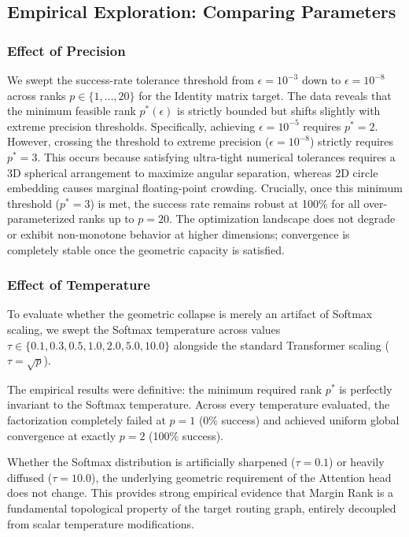 
\subsection{Empirical Exploration: Comparing Parameters}

\subsubsection{Effect of Precision}
We swept the success-rate tolerance threshold from $\epsilon=10^{-3}$ down to $\epsilon=10^{-8}$ across ranks $p \in \{1, \dots, 20\}$ for the Identity matrix target. The data reveals that the minimum feasible rank $p^*(\epsilon)$ is strictly bounded but shifts slightly with extreme precision thresholds. 
Specifically, achieving $\epsilon=10^{-5}$ requires $p^* = 2$. However, crossing the threshold to extreme precision ($\epsilon=10^{-8}$) strictly requires $p^* = 3$. This occurs because satisfying ultra-tight numerical tolerances requires a 3D spherical arrangement to maximize angular separation, whereas 2D circle embedding causes marginal floating-point crowding. 
Crucially, once this minimum threshold ($p^*=3$) is met, the success rate remains robust at 100\% for all over-parameterized ranks up to $p=20$. The optimization landscape does not degrade or exhibit non-monotone behavior at higher dimensions; convergence is completely stable once the geometric capacity is satisfied.

\subsubsection{Effect of Temperature}
To evaluate whether the geometric collapse is merely an artifact of Softmax scaling, we swept the Softmax temperature across values $\tau \in \{0.1, 0.3, 0.5, 1.0, 2.0, 5.0, 10.0\}$ alongside the standard Transformer scaling ($\tau = \sqrt{p}$). 

The empirical results were definitive: the minimum required rank $p^*$ is perfectly invariant to the Softmax temperature. Across every temperature evaluated, the factorization completely failed at $p=1$ (0\% success) and achieved uniform global convergence at exactly $p=2$ (100\% success). 

Whether the Softmax distribution is artificially sharpened ($\tau=0.1$) or heavily diffused ($\tau=10.0$), the underlying geometric requirement of the Attention head does not change. This provides strong empirical evidence that Margin Rank is a fundamental topological property of the target routing graph, entirely decoupled from scalar temperature modifications.

